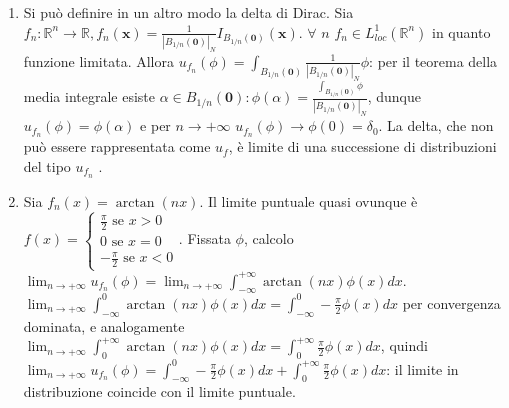 \documentclass{article}
\begin{document}
\begin{enumerate}
\item Si pu\`{o} definire in un altro modo la delta di Dirac. Sia $f_{n}:%
\mathbb{R}
^{n}\rightarrow 
\mathbb{R}
,f_{n}\left( \mathbf{x}\right) =\frac{1}{\left\vert B_{1/n}\left( \mathbf{0}%
\right) \right\vert _{N}}I_{B_{1/n}\left( \mathbf{0}\right) }\left( \mathbf{x%
}\right) $. $\forall $ $n$ $f_{n}\in L_{loc}^{1}\left( 
\mathbb{R}
^{n}\right) $ in quanto funzione limitata. Allora $u_{f_{n}}\left( \phi
\right) =\int_{B_{1/n}\left( \mathbf{0}\right) }\frac{1}{\left\vert
B_{1/n}\left( \mathbf{0}\right) \right\vert _{N}}\phi $: per il teorema
della media integrale esiste $\alpha \in B_{1/n}\left( \mathbf{0}\right)
:\phi \left( \alpha \right) =\frac{\int_{B_{1/n}\left( \mathbf{0}\right)
}\phi }{\left\vert B_{1/n}\left( \mathbf{0}\right) \right\vert _{N}}$,
dunque $u_{f_{n}}\left( \phi \right) =\phi \left( \alpha \right) $ e per $%
n\rightarrow +\infty $ $u_{f_{n}}\left( \phi \right) \rightarrow \phi \left(
0\right) =\delta _{0}$. La delta, che non pu\`{o} essere rappresentata come $%
u_{f}$, \`{e} limite di una successione di distribuzioni del tipo $u_{f_{n}}$%
.

\item Sia $f_{n}\left( x\right) =\arctan \left( nx\right) $. Il limite
puntuale quasi ovunque \`{e} $f\left( x\right) =\left\{ 
\begin{array}{c}
\frac{\pi }{2}\text{ se }x>0 \\ 
0\text{ se }x=0 \\ 
-\frac{\pi }{2}\text{ se }x<0%
\end{array}%
\right. $. Fissata $\phi $, calcolo $\lim_{n\rightarrow +\infty
}u_{f_{n}}\left( \phi \right) =\lim_{n\rightarrow +\infty }\int_{-\infty
}^{+\infty }\arctan \left( nx\right) \phi \left( x\right) dx$. $%
\lim_{n\rightarrow +\infty }\int_{-\infty }^{0}\arctan \left( nx\right) \phi
\left( x\right) dx=\int_{-\infty }^{0}-\frac{\pi }{2}\phi \left( x\right) dx$
per convergenza dominata, e analogamente $\lim_{n\rightarrow +\infty
}\int_{0}^{+\infty }\arctan \left( nx\right) \phi \left( x\right)
dx=\int_{0}^{+\infty }\frac{\pi }{2}\phi \left( x\right) dx$, quindi $%
\lim_{n\rightarrow +\infty }u_{f_{n}}\left( \phi \right) =\int_{-\infty
}^{0}-\frac{\pi }{2}\phi \left( x\right) dx+\int_{0}^{+\infty }\frac{\pi }{2}%
\phi \left( x\right) dx$: il limite in distribuzione coincide con il limite
puntuale.
\end{enumerate}
\end{document}
